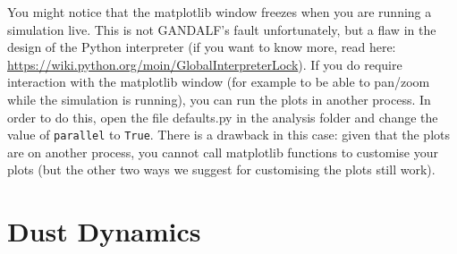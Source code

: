 \documentclass[a4paper]{article}
\newcommand{\var}[1]{\texttt{#1}}
\begin{document}
You might notice that the matplotlib window freezes when you are running a simulation live. This is not GANDALF's fault unfortunately, but a flaw in the design of the Python interpreter (if you want to know more, read here: \url{https://wiki.python.org/moin/GlobalInterpreterLock}). If you do require interaction with the matplotlib window (for example to be able to pan/zoom while the simulation is running), you can run the plots in another process. In order to do this, open the file defaults.py in the analysis folder and change the value of \var{parallel} to \lstinline{True}. There is a drawback in this case: given that the plots are on another process, you cannot call matplotlib functions to customise your plots (but the other two ways we suggest for customising the plots still work).

\newpage

\section{Dust Dynamics}

\label{sec:dust}
\end{document}
